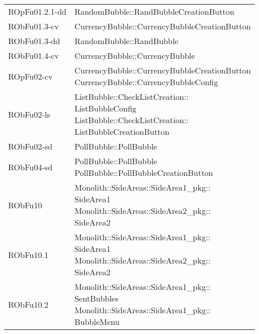 \begin{center}
\begin{longtable}{|
*{1}{>{\centering\arraybackslash}m{2.5cm}|}
*{1}{>{\centering\arraybackslash}m{7.5cm}|}}
{\\}\\\hline
ROpFu01.2.1-dd & \makecell[l]{RandomBubble::RandBubbleCreationButton
\\}\\\hline
RObFu01.3-cv & \makecell[l]{CurrencyBubble::CurrencyBubbleCreationButton
\\}\\\hline
RObFu01.3-dd & \makecell[l]{RandomBubble::RandBubble
\\}\\\hline
RObFu01.4-cv & \makecell[l]{CurrencyBubble::CurrencyBubble
\\}\\\hline
ROpFu02-cv & \makecell[l]{CurrencyBubble::CurrencyBubbleCreationButton
\\CurrencyBubble::CurrencyBubbleConfig
\\}\\\hline
RObFu02-ls & \makecell[l]{ListBubble::CheckListCreation:: \\ \hfill ListBubbleConfig
\\ListBubble::CheckListCreation:: \\ \hfill ListBubbleCreationButton
\\}\\\hline
RObFu02-sd & \makecell[l]{PollBubble::PollBubble
\\}\\\hline
RObFu04-sd & \makecell[l]{PollBubble::PollBubble
\\PollBubble::PollBubbleCreationButton
\\}\\\hline
RObFu10 & \makecell[l]{Monolith::SideAreas::SideArea1\_pkg:: \\ \hfill SideArea1
\\Monolith::SideAreas::SideArea2\_pkg:: \\ \hfill SideArea2
\\}\\\hline
RObFu10.1 & \makecell[l]{Monolith::SideAreas::SideArea1\_pkg:: \\ \hfill SideArea1
\\Monolith::SideAreas::SideArea2\_pkg:: \\ \hfill SideArea2
\\}\\\hline
RObFu10.2 & \makecell[l]{Monolith::SideAreas::SideArea1\_pkg:: \\ \hfill SentBubbles
\\Monolith::SideAreas::SideArea1\_pkg:: \\ \hfill BubbleMenu
}
\end{longtable}
\end{center}
